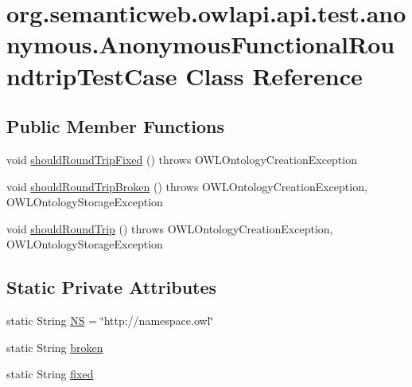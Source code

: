 \hypertarget{classorg_1_1semanticweb_1_1owlapi_1_1api_1_1test_1_1anonymous_1_1_anonymous_functional_roundtrip_test_case}{\section{org.\-semanticweb.\-owlapi.\-api.\-test.\-anonymous.\-Anonymous\-Functional\-Roundtrip\-Test\-Case Class Reference}
\label{classorg_1_1semanticweb_1_1owlapi_1_1api_1_1test_1_1anonymous_1_1_anonymous_functional_roundtrip_test_case}
}
\subsection*{Public Member Functions}
\begin{DoxyCompactItemize}
\item 
void \hyperlink{classorg_1_1semanticweb_1_1owlapi_1_1api_1_1test_1_1anonymous_1_1_anonymous_functional_roundtrip_test_case_abede2545fc485928774eab9edd0803d4}{should\-Round\-Trip\-Fixed} ()  throws O\-W\-L\-Ontology\-Creation\-Exception 
\item 
void \hyperlink{classorg_1_1semanticweb_1_1owlapi_1_1api_1_1test_1_1anonymous_1_1_anonymous_functional_roundtrip_test_case_ae9315f95f3e81e237be9a21b7257de9c}{should\-Round\-Trip\-Broken} ()  throws O\-W\-L\-Ontology\-Creation\-Exception,             O\-W\-L\-Ontology\-Storage\-Exception 
\item 
void \hyperlink{classorg_1_1semanticweb_1_1owlapi_1_1api_1_1test_1_1anonymous_1_1_anonymous_functional_roundtrip_test_case_a6b1d43cee4bc44d0e1fc0fde041ca048}{should\-Round\-Trip} ()  throws O\-W\-L\-Ontology\-Creation\-Exception,             O\-W\-L\-Ontology\-Storage\-Exception 
\end{DoxyCompactItemize}
\subsection*{Static Private Attributes}
\begin{DoxyCompactItemize}
\item 
static String \hyperlink{classorg_1_1semanticweb_1_1owlapi_1_1api_1_1test_1_1anonymous_1_1_anonymous_functional_roundtrip_test_case_a40e310cb840ac67c73a0a91e7bec4149}{N\-S} = \char`\"{}http\-://namespace.\-owl\char`\"{}
\item 
static String \hyperlink{classorg_1_1semanticweb_1_1owlapi_1_1api_1_1test_1_1anonymous_1_1_anonymous_functional_roundtrip_test_case_a8442a71085b4dc2cbc47e9485bc05a7e}{broken}
\item 
static String \hyperlink{classorg_1_1semanticweb_1_1owlapi_1_1api_1_1test_1_1anonymous_1_1_anonymous_functional_roundtrip_test_case_afb329aafe42661dcf0c787507485b0ac}{fixed}
\end{DoxyCompactItemize}


